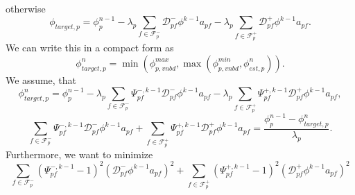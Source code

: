 \documentclass[../thesis.tex]{subfiles}
\begin{document}
otherwise
\[
	\phi_{target,p} = \phi_p^{n-1}
	- \lambda_p \sum_{f \in \mathcal{F}_p^-}
	\mathcal{D}^-_{pf}\phi^{k-1} a_{pf}
	- \lambda_p \sum_{f \in \mathcal{F}_p^+}
	\mathcal{D}^+_{pf}\phi^{k-1} a_{pf}.
\]
We can write this in a compact form as
\begin{equation}
	\phi_{target,p}^n =
	\min
	\left( \phi_{p, vnbd}^{max},
	\max
	\left( \phi_{p, vnbd}^{min}, \phi_{est,p}^n \right) \right).
\end{equation}
We assume, that
\begin{equation}
	\phi_{target,p}^n = \phi_p^{n-1}
	- \lambda_p \sum_{f \in \mathcal{F}_p^-}
	\Psi_{pf}^{-,k-1}\mathcal{D}^-_{pf}\phi^{k-1} a_{pf}
	- \lambda_p \sum_{f \in \mathcal{F}_p^+}
	\Psi_{pf}^{+,k-1}\mathcal{D}^+_{pf}\phi^{k-1} a_{pf},
\end{equation}
\begin{equation}
	\sum_{f \in \mathcal{F}_p^-}
	\Psi_{pf}^{-,k-1}\mathcal{D}^-_{pf}\phi^{k-1} a_{pf}
	+ \sum_{f \in \mathcal{F}_p^+}
	\Psi_{pf}^{+,k-1}\mathcal{D}^+_{pf}\phi^{k-1} a_{pf}
	=
	\frac{\phi_p^{n-1} - \phi_{target,p}^n}{\lambda_p}.
\end{equation}
Furthermore, we want to minimize
\begin{equation}
	\sum_{f \in \mathcal{F}_p^-}
	\left( \Psi_{pf}^{-,k-1} - 1 \right)^2
	\left( \mathcal{D}^-_{pf}\phi^{k-1} a_{pf} \right)^2
	+ \sum_{f \in \mathcal{F}_p^+}
	\left( \Psi_{pf}^{+,k-1} - 1 \right)^2
	\left( \mathcal{D}^+_{pf}\phi^{k-1} a_{pf} \right)^2
\end{equation}
\end{document}
